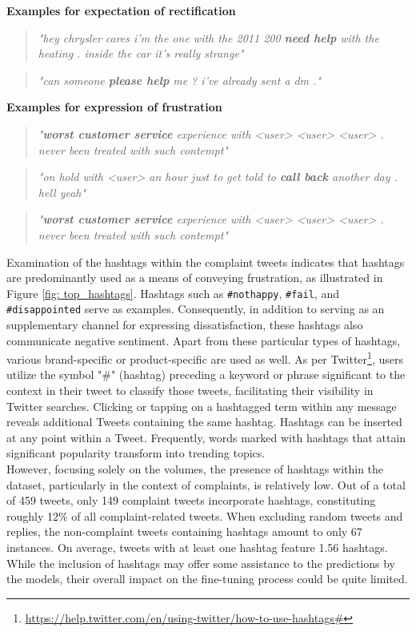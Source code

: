\textbf{Examples for expectation of rectification}
\begin{quote}
    \textit{"hey chrysler cares i'm the one with the 2011 200 \textbf{need help} with the heating . inside the car it's really strange"}
\end{quote}
\begin{quote}
    \textit{"can someone \textbf{please help} me ? i've already sent a dm ."}
\end{quote}
\textbf{Examples for expression of frustration}
\begin{quote}
    \textit{"\textbf{worst customer service} experience with <user> <user> <user> . never been treated with such contempt"}
\end{quote}
\begin{quote}
    \textit{"on hold with <user> an hour just to get told to \textbf{call back} another day . hell yeah"}
\end{quote}
\begin{quote}
    \textit{"\textbf{worst customer service} experience with <user> <user> <user> . never been treated with such contempt"}
\end{quote}

Examination of the hashtags within the complaint tweets indicates that hashtags are predominantly used as a means of conveying frustration, as illustrated in Figure \ref{fig: top_hashtags}. Hashtags such as \texttt{\#nothappy}, \texttt{\#fail}, and \texttt{\#disappointed} serve as examples. Consequently, in addition to serving as an supplementary channel for expressing dissatisfaction, these hashtags also communicate negative sentiment. Apart from these particular types of hashtags, various brand-specific or product-specific are used as well. As per Twitter\footnote{\url{https://help.twitter.com/en/using-twitter/how-to-use-hashtags#}}, users utilize the symbol "\#" (hashtag) preceding a keyword or phrase significant to the context in their tweet to classify those tweets, facilitating their visibility in Twitter searches. Clicking or tapping on a hashtagged term within any message reveals additional Tweets containing the same hashtag. Hashtags can be inserted at any point within a Tweet. Frequently, words marked with hashtags that attain significant popularity transform into trending topics. \\

However, focusing solely on the volumes, the presence of hashtags within the dataset, particularly in the context of complaints, is relatively low. Out of a total of 459 tweets, only 149 complaint tweets incorporate hashtags, constituting roughly 12\% of all complaint-related tweets. When excluding random tweets and replies, the non-complaint tweets containing hashtags amount to only 67 instances. On average, tweets with at least one hashtag feature 1.56 hashtags. While the inclusion of hashtags may offer some assistance to the predictions by the models, their overall impact on the fine-tuning process could be quite limited.

